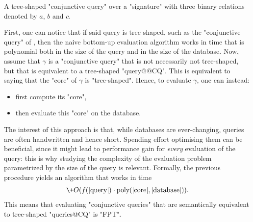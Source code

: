 \begin{marginfigure}
	\centering
	\caption{
		\AP\label{fig:intro-tree-shaped-CQ}
		A tree-shaped "conjunctive query" over a "signature"
		with three binary relations denoted by $a$, $b$ and $c$.
	}
\end{marginfigure}
First, one can notice that if said query is tree-shaped,
such as the "conjunctive query" of , then the naive
bottom-up evaluation algorithm works in time that is polynomial both
in the size of the query and in the size of the database.
Now, assume that $\gamma$ is a "conjunctive query" that is not necessarily
not tree-shaped, but that is equivalent to a tree-shaped "query@@CQ".
This is equivalent to saying that the "core" of $\gamma$ is "tree-shaped".
Hence, to evaluate $\gamma$, one can instead:
\begin{itemize}
	\item first compute its "core",
	\item then evaluate this "core" on the database.
\end{itemize}
The interest of this approach is that, while databases are ever-changing,
queries are often handwritten and hence short. Spending effort optimising them can be beneficial, since it might lead to performance gain
for \emph{every} evaluation of the query: this is why studying the
complexity of the evaluation problem parametrized by the size of
the query is relevant.
Formally, the previous procedure yields an algorithm that works in time
\[
	\+O(f(|\text{query}|) \cdot \text{poly}(|\text{core}|, |\text{database}|)).
\]
This means that evaluating "conjunctive queries" that are semantically equivalent to
tree-shaped "queries@CQ" is "FPT".

